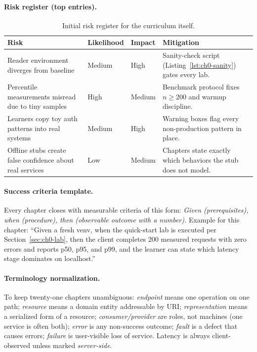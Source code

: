 \paragraph{Risk register (top entries).}

\begin{table}[h]
  \centering
  \small
  \begin{tabularx}{\textwidth}{X l l X}
    \toprule
    \textbf{Risk} & \textbf{Likelihood} & \textbf{Impact} & \textbf{Mitigation} \\
    \midrule
    Reader environment diverges from baseline & Medium & High &
      Sanity-check script (Listing~\ref{lst:ch0-sanity}) gates every lab. \\
    Percentile measurements misread due to tiny samples & High & Medium &
      Benchmark protocol fixes $n \geq 200$ and warmup discipline. \\
    Learners copy toy auth patterns into real systems & Medium & High &
      Warning boxes flag every non-production pattern in place. \\
    Offline stubs create false confidence about real services & Low & Medium &
      Chapters state exactly which behaviors the stub does not model. \\
    \bottomrule
  \end{tabularx}
  \caption{Initial risk register for the curriculum itself.}
  \label{tab:ch0-risk}
\end{table}

\paragraph{Success criteria template.}
Every chapter closes with measurable criteria of this form: \emph{Given
(prerequisites), when (procedure), then (observable outcome with a number).}
Example for this chapter: ``Given a fresh venv, when the quick-start lab is
executed per Section~\ref{sec:ch0-lab}, then the client completes 200
measured requests with zero errors and reports p50, p95, and p99, and the
learner can state which latency stage dominates on localhost.''

\paragraph{Terminology normalization.}
To keep twenty-one chapters unambiguous: \emph{endpoint} means one operation
on one path; \emph{resource} means a domain entity addressable by URI;
\emph{representation} means a serialized form of a resource;
\emph{consumer/provider} are roles, not machines (one service is often both);
\emph{error} is any non-success outcome; \emph{fault} is a defect that causes
errors; \emph{failure} is user-visible loss of service. Latency is always
client-observed unless marked \emph{server-side}.
